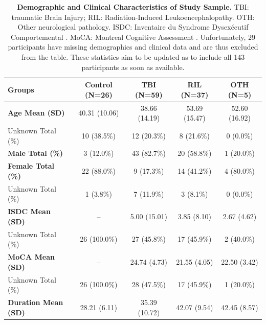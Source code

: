 \begin{table}[H]
    \centering
    \begin{tabular}{p{4cm}cccc}
    \hline
    \textbf{Groups} & \textbf{Control (N=26)} & \textbf{TBI (N=59)} & \textbf{RIL (N=37)} & \textbf{OTH (N=5)} \\
    \hline
    \textbf{Age Mean (SD)} & 40.31 (10.06) & 38.66 (14.19) & 53.69 (15.47) & 52.60 (16.92) \\
    \quad Unknown Total (\%) & 10 (38.5\%) & 12 (20.3\%) & 8 (21.6\%) & 0 (0.0\%) \\
    \textbf{Male Total (\%)} & 3 (12.0\%) & 43 (82.7\%) & 20 (58.8\%) & 1 (20.0\%) \\
    \textbf{Female Total (\%)} & 22 (88.0\%) & 9 (17.3\%) & 14 (41.2\%) & 4 (80.0\%) \\
    \quad Unknown Total (\%)  & 1 (3.8\%) & 7 (11.9\%) & 3 (8.1\%) & 0 (0.0\%) \\
    \textbf{ISDC Mean (SD)} & -- & 5.00 (15.01) & 3.85 (8.10) & 2.67 (4.62) \\
    \quad Unknown Total (\%) & 26 (100.0\%) & 27 (45.8\%) & 17 (45.9\%) & 2 (40.0\%) \\
    \textbf{MoCA Mean (SD)} & -- & 24.74 (4.73) & 21.55 (4.05) & 22.50 (3.42) \\
    \quad Unknown Total (\%) & 26 (100.0\%) & 28 (47.5\%) & 17 (45.9\%) & 1 (20.0\%) \\
    \textbf{Duration Mean (SD)} & 28.21 (6.11) & 35.39 (10.72) & 42.07 (9.54) & 42.45 (8.57) \\
    \hline
    \end{tabular}
    \caption{\textbf{Demographic and Clinical Characteristics of Study Sample.} TBI: traumatic Brain Injury; RIL: Radiation-Induced Leukoencephalopathy. OTH: Other neurological pathology. ISDC: Inventaire du Syndrome Dysexécutif Comportemental \cite{ISDC, Godefroy2008-sa}. MoCA: Montreal Cognitive Assessment \cite{MoCA}. Unfortunately, 29 participants have missing demographics and clinical data and are thus excluded from the table. These statistics aim to be updated as to include all 143 participants as soon as available.}
    \label{table:chapter_4_demographics_clinical}
\end{table}






